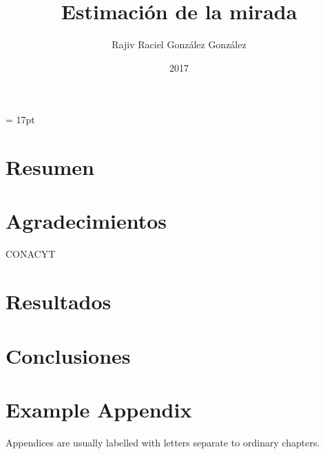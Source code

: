 \documentclass[12pt,oneside]{book}
\begin{document}
\baselineskip = 17pt


\title{ Estimación de la mirada}
\author{Rajiv Raciel González González}
\date{2017}
\maketitle 
\frontmatter

\chapter{Resumen}


\tableofcontents




\listoffigures





\chapter{Agradecimientos}

CONACYT




\mainmatter

   
 




 


\chapter{Resultados}

\chapter{Conclusiones}



\appendix
\chapter{Example Appendix}
Appendices are usually labelled with letters separate to ordinary chapters.








%
%
%
%

\end{document}
